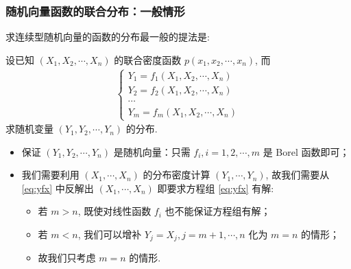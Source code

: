  \begin{frame}
 	\frametitle{随机向量函数的联合分布：一般情形}
 	求连续型随机向量的函数的分布最一般的提法是:

 	设已知 $(X_1,X_2,\cdots,X_n)$ 的联合密度函数 $p (x_1,x_2,\cdots, x_n)$, 而
 	\begin{eqnarray}
 		\label{eq:yfx}
 		\left\{
 		\begin{array}{l}
 			Y_1=f_1(X_1,X_2,\cdots,X_n)\\
 			Y_2=f_2(X_1,X_2,\cdots,X_n)\\
 			\cdots\\
 			Y_m=f_m(X_1,X_2,\cdots,X_n)
 		\end{array}
 		\right.
 	\end{eqnarray}
 	求随机变量 $(Y_1,Y_2,\cdots,Y_n)$ 的分布.

 	\pause
 	\begin{itemize}[<+-|alert@+>]
 		\item 保证 $(Y_1,Y_2,\cdots, Y_n)$ 是随机向量：只需 $f_i, i=1,2,\cdots, m$ 是 Borel 函数即可；
 		\item 我们需要利用 $(X_1,\cdots, X_n)$ 的分布密度计算 $(Y_1,\cdots,Y_n)$, 故我们需要从 \eqref{eq:yfx} 中反解出 $(X_1,\cdots,X_n)$ 即要求方程组 \eqref{eq:yfx} 有解:
 		\begin{itemize}
 			\item 若 $m>n$, 既使对线性函数 $f_i$ 也不能保证方程组有解；
 			\item 若 $m<n$, 我们可以增补 $Y_j=X_j, j=m+1,\cdots, n$ 化为 $m=n$ 的情形；
 			\item 故我们只考虑 $m=n$ 的情形.
 		\end{itemize}

 	\end{itemize}

 \end{frame}
